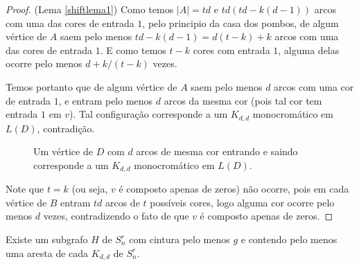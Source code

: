 \begin{proof}{(Lema \ref{shiftlema1})}
Como temos $|A| = td$ e $td(td - k(d-1))$ arcos com uma das cores de entrada $1$, pelo principio da casa dos pombos, de algum vértice de $A$ saem pelo menos $td - k(d-1) = d(t-k) + k$ arcos com uma das cores de entrada $1$. E como temos $t-k$ cores com entrada $1$, alguma delas ocorre pelo menos $d + k/(t-k)$ vezes. 

Temos portanto que de algum vértice de $A$ saem pelo menos $d$ arcos com uma cor de entrada $1$, e entram pelo menos $d$ arcos da mesma cor (pois tal cor tem entrada $1$ em $v$). Tal configuração corresponde a um $K_{d,d}$ monocromático em $L(D)$, contradição.

\begin{figure}[H]
\centering
{}
\caption{Um vértice de $D$ com $d$ arcos de mesma cor entrando e saindo corresponde a um $K_{d,d}$ monocromático em $L(D)$.}
\label{fig:shiftkdd}
\end{figure}

Note que $t=k$ (ou seja, $v$ é composto apenas de zeros) não ocorre, pois em cada vértice de $B$ entram $td$ arcos de $t$ possíveis cores, logo alguma cor ocorre pelo menos $d$ vezes, contradizendo o fato de que $v$ é composto apenas de zeros.
\end{proof}

\begin{lema}\label{shiftlema2}
Existe um subgrafo $H$ de $S_n^r$ com cintura pelo menos $g$ e contendo pelo menos uma aresta de cada $K_{d,d}$ de $S_n^r$.
\end{lema}


